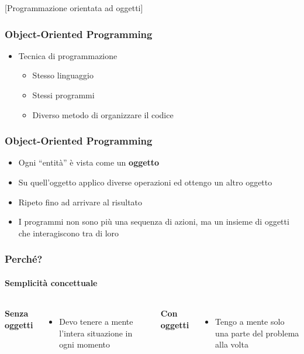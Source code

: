 [Programmazione orientata ad oggetti]

\begin{contentframe}
    \frametitle{Object-Oriented Programming}

    \begin{itemize}
        \item Tecnica di programmazione
        \begin{itemize}
            \item Stesso linguaggio
            \item Stessi programmi
            \item Diverso metodo di organizzare il codice
        \end{itemize}
    \end{itemize}
\end{contentframe}

\begin{contentframe}
    \frametitle{Object-Oriented Programming}

    \begin{itemize}
        \item Ogni ``entità'' è vista come un \textbf{oggetto}

        \bigskip
        \item Su quell'oggetto applico diverse operazioni ed ottengo un altro oggetto
        \item Ripeto fino ad arrivare al risultato

        \bigskip
        \item I programmi non sono più una sequenza di azioni, ma un insieme di oggetti che interagiscono tra di loro
    \end{itemize}
\end{contentframe}

\begin{contentframe}
    \frametitle{Perché?}
    \framesubtitle{Semplicità concettuale}

    \begin{columns}
        \textbf{Senza oggetti}
        \begin{itemize}
            \item Devo tenere a mente l'intera situazione in ogni momento
        \end{itemize}
        
        \textbf{Con oggetti}
        \begin{itemize}
            \item Tengo a mente solo una parte del problema alla volta
        \end{itemize}
    \end{columns}
\end{contentframe}


